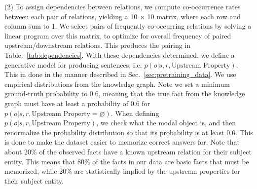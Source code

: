 \documentclass[11pt,a4paper]{article}
\begin{document}
(2) To assign dependencies between relations, we compute co-occurrence rates between each pair of relations, yielding a 10 $\times$ 10 matrix, where each row and column sum to 1. We select pairs of frequently co-occurring relations by solving a linear program over this matrix, to optimize for overall frequency of paired upstream/downstream relations. This produces the pairing in Table.~\ref{tab:dependencies}. With these dependencies determined, we define a generative model for producing sentences, i.e. $p(o|s, r, \textrm{Upstream Property})$. This in done in the manner described in Sec.~\ref{sec:pretraining_data}. We use empirical distributions from the knowledge graph. Note we set a minimum ground-truth probability to 0.6, meaning that the true fact from the knowledge graph must have at least a probability of 0.6 for $p(o|s,r, \textrm{Upstream Property}=\varnothing)$. When defining $p(o|s,r, \textrm{Upstream Property})$, we check what the modal object is, and then renormalize the probability distribution so that its probability is at least 0.6. This is done to make the dataset easier to memorize correct answers for. Note that about 20\% of the observed facts have a known upstream relation for their subject entity. This means that 80\% of the facts in our data are basic facts that must be memorized, while 20\% are statistically implied by the upstream properties for their subject entity. 
\end{document}
